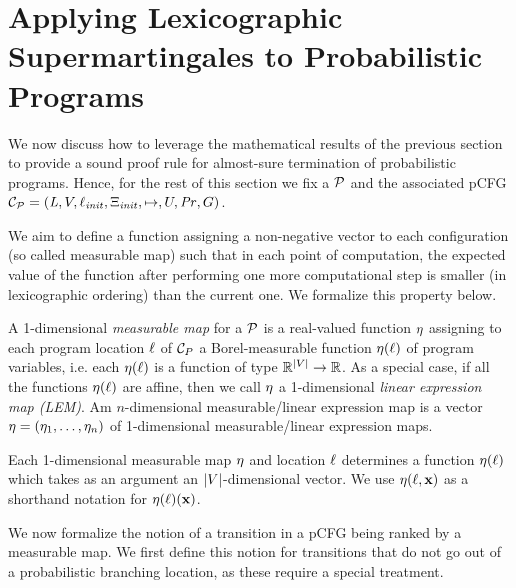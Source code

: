 \section{Applying Lexicographic Supermartingales to Probabilistic Programs}
\label{sec:lex-programs}

We now discuss how to leverage the mathematical results of the previous section 
to provide a sound proof rule for almost-sure termination of probabilistic 
programs. Hence, for the rest of this section we fix a \PP{} $\mathcal{P}$ and the 
associated pCFG 
$\mathcal{C}_{\mathcal{P}}=(\mathit{L},V,\ell_{\mathit{init}},\Xi_{\mathit{init}},\mapsto,U,\mathit{Pr},G)$.

We aim to define a function assigning a non-negative vector to each 
configuration (so called measurable map) such that in each point of 
computation, the expected value of the function after performing one more 
computational step is smaller (in lexicographic ordering) than the current one. 
We formalize this property below.

\begin{definition}
A 1-dimensional \emph{measurable map} for a \PP{} $\mathcal{P}$ is a  
real-valued function $\eta$ 
assigning to each program location $\ell$ of $\mathcal{C}_P$ a Borel-measurable function $\eta(\ell)$  of program variables, i.e. each $\eta(\ell)$  is a function of type $\mathbb{R}^{|V|}\rightarrow \mathbb{R}$. As a special case, if all the functions $\eta(\ell)$ are affine, then we call $\eta$ a 1-dimensional \emph{linear expression map (LEM)}. 
Am $n$-dimensional measurable/linear expression map is a vector $\mathbf{\eta}=(\eta_1,\dots,\eta_n)$ of 1-dimensional measurable/linear expression maps. 
\end{definition}

Each 1-dimensional measurable map $\eta$ and location $\ell$ determines a function $\eta(\ell)$ 
which takes as an argument an $|V|$-dimensional vector. We use $\eta(\ell,\mathbf{x})$ as a shorthand 
notation for $\eta(\ell)(\mathbf{x})$.

We now formalize the notion of a transition in a pCFG being ranked by a 
measurable map. We first define this notion for transitions that do not go out 
of a probabilistic branching location, as these require a special treatment.

